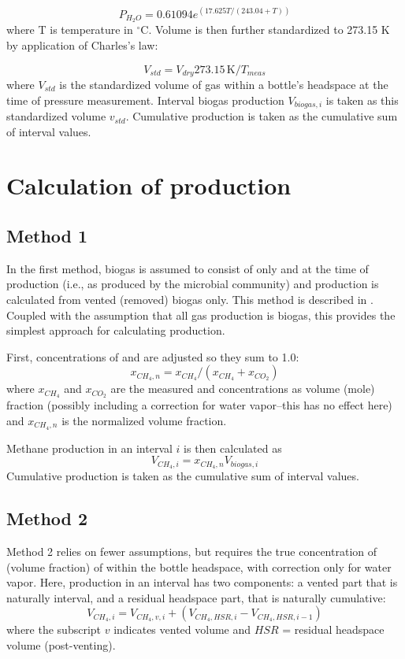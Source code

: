 \documentclass[]{article}
\newcommand{\unit}[1]{\ensuremath{\, \mathrm{#1}}}
\begin{document}
\begin{equation}
\label{eq:magnus}
   P_{H_2O} = 0.61094 e^{(17.625 T/(243.04 + T))}
\end{equation}
where T is temperature in $^\circ$C.
Volume is then further standardized to 273.15 K by application of Charles's law:

\begin{equation}
  \label{eq:bgstd}
  V_{std} = V_{dry} 273.15 \unit{K}/T_{meas}
\end{equation}
where $V_{std}$ is the standardized volume of gas within a bottle's headspace at the time of pressure measurement.
Interval biogas production $V_{biogas, i}$ is taken as this standardized volume $v_{std}$.
Cumulative production is taken as the cumulative sum of interval values. 

\section{Calculation of  production}
\subsection{Method 1}
In the first method, biogas is assumed to consist of only  and  at the time of production (i.e., as produced by the microbial community) and  production is calculated from vented (removed) biogas only.
This method is described in \cite{brian1991}.
Coupled with the assumption that all gas production is biogas, this provides the simplest approach for calculating  production.

First, concentrations of  and  are adjusted so they sum to 1.0:
\begin{equation}
  x_{CH_4, n} = x_{CH_4}/(x_{CH_4} + x_{CO_2})
\end{equation}
where $x_{CH_4}$ and $x_{CO_2}$ are the measured  and  concentrations as volume (mole) fraction (possibly including a correction for water vapor--this has no effect here) and $x_{CH_4, n}$ is the normalized  volume fraction.

Methane production in an interval $i$ is then calculated as
\begin{equation}
  V_{CH_4, i} = x_{CH_4, n} V_{biogas, i}
\end{equation}
Cumulative production is taken as the cumulative sum of interval values. 

\subsection{Method 2}
Method 2 relies on fewer assumptions, but requires the true concentration of  (volume fraction) of  within the bottle headspace, with correction only for water vapor.
Here,  production in an interval has two components: a vented part that is naturally interval, and a residual headspace part, that is naturally cumulative:
\begin{equation}
  V_{CH_4, i} = V_{CH_4, v, i} + ( V_{CH_4, HSR, i} - V_{CH_4, HSR, i-1} )
\end{equation}
where the subscript $v$ indicates vented volume and $HSR$ = residual headspace volume (post-venting).
\end{document}
